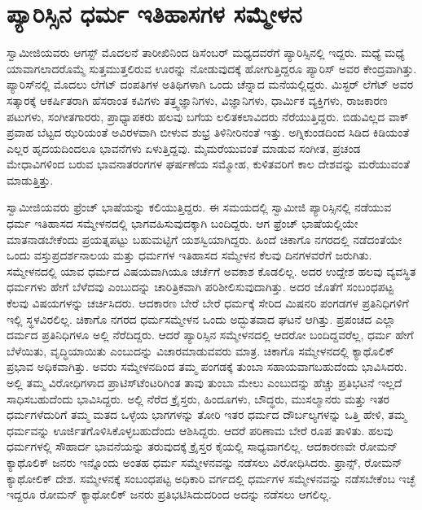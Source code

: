 
\chapter{ಪ್ಯಾರಿಸ್ಸಿನ ಧರ್ಮ ಇತಿಹಾಸಗಳ ಸಮ್ಮೇಳನ  }

 ಸ್ವಾಮೀಜಿಯವರು ಆಗಸ್ಟ್ ಮೊದಲನೆ ತಾರೀಖಿನಿಂದ ಡಿಸೆಂಬರ್ ಮಧ್ಯದವರೆಗೆ ಪ್ಯಾರಿಸ್ಸಿನಲ್ಲಿ ಇದ್ದರು. ಮಧ್ಯೆ ಮಧ್ಯೆ ಯಾವಾಗಲಾದರೊಮ್ಮೆ ಸುತ್ತಮುತ್ತಲಿರುವ ಊರನ್ನು ನೋಡುವುದಕ್ಕೆ ಹೋಗುತ್ತಿದ್ದರೂ ಪ್ಯಾರಿಸ್ ಅವರ ಕೇಂದ್ರವಾಗಿತ್ತು. ಪ್ಯಾರಿಸ್‍ನಲ್ಲಿ ಮೊದಲು ಲೆಗೆಟ್ ದಂಪತಿಗಳ ಅತಿಥಿಗಳಾಗಿ ಒಂದು ಚೆನ್ನಾದ ಮನೆಯಲ್ಲಿದ್ದರು. ಮಿಸ್ಟರ್ ಲೆಗೆಟ್ ಅವರ ಸತ್ಕಾರಕ್ಕೆ ಆಕರ್ಷಿತರಾಗಿ ಹೆಸರಾಂತ ಕವಿಗಳು ತತ್ತ್ವಜ್ಞಾನಿಗಳು, ವಿಜ್ಞಾನಿಗಳು, ಧಾರ್ಮಿಕ ವ್ಯಕ್ತಿಗಳು, ರಾಜಕಾರಣ ಪಟುಗಳು, ಸಂಗೀತಗಾರರು, ಪ್ರಾಧ್ಯಾಪಕರು ಹಲವು ಬಗೆಯ ಲಲಿತಕಲಾವಿದರು ನೆರೆಯುತ್ತಿದ್ದರು. ಬಿಡುವಿಲ್ಲದ ವಾಕ್ ಪ್ರವಾಹ ಬೆಟ್ಟದ ಝರಿಯಂತೆ ಅವಿರಳವಾಗಿ ಬೀಳುವ ಶುಭ್ರ ತಿಳಿನೀರಿನಂತೆ ಇತ್ತು. ಅಗ್ನಿಕುಂಡದಿಂದ ಸಿಡಿದ ಕಿಡಿಯಂತೆ ಎಲ್ಲರ ಹೃದಯದಿಂದಲೂ ಭಾವನೆಗಳು ಏಳುತ್ತಿದ್ದವು. ಮೈಮರೆಯುವಂತೆ ಮಾಡುವ ಸಂಗೀತ, ಪ್ರಚಂಡ ಮೇಧಾವಿಗಳಿಂದ ಬರುವ ಭಾವನಾತರಂಗಗಳ ಘರ್ಷಣೆಯ ಸಮ್ಮೋಹ, ಕುಳಿತವರಿಗೆ ಕಾಲ ದೇಶವನ್ನು ಮರೆಯುವಂತೆ ಮಾಡುತ್ತಿತ್ತು. 

 ಸ್ವಾಮೀಜಿಯವರು ಫ್ರೆಂಚ್ ಭಾಷೆಯನ್ನು ಕಲಿಯುತ್ತಿದ್ದರು. ಈ ಸಮಯದಲ್ಲಿ ಸ್ವಾಮೀಜಿ ಪ್ಯಾರಿಸ್ಸಿನಲ್ಲಿ ನಡೆಯುವ ಧರ್ಮ ಇತಿಹಾಸದ ಸಮ್ಮೇಳನದಲ್ಲಿ ಭಾಗವಹಿಸುವುದಕ್ಕಾಗಿ ಬಂದಿದ್ದರು. ಆಗ ಫ್ರೆಂಚ್ ಭಾಷೆಯಲ್ಲಿಯೇ ಮಾತನಾಡಬೇಕೆಂದು ಪ್ರಯತ್ನಪಟ್ಟು ಬಹುಮಟ್ಟಿಗೆ ಯಶಸ್ವಿಯಾಗಿದ್ದರು. ಹಿಂದೆ ಚಿಕಾಗೊ ನಗರದಲ್ಲಿ ನಡೆದಂತೆಯೇ ಒಂದು ವಸ್ತುಪ್ರದರ್ಶನಾಲಯ ಮತ್ತು ಧರ್ಮಗಳ ಇತಿಹಾಸದ ಸಮ್ಮೇಳನ ಕೆಲವು ದಿನಗಳವರೆಗೆ ಜರುಗಿತು. ಸಮ್ಮೇಳನದಲ್ಲಿ ಯಾವ ಧರ್ಮದ ವಿಷಯವಾಗಿಯೂ ಚರ್ಚೆಗೆ ಅವಕಾಶ ಕೊಡಲಿಲ್ಲ. ಅದರ ಉದ್ದೇಶ ಹಲವು ವ್ಯವಸ್ಥಿತ ಧರ್ಮಗಳು ಹೇಗೆ ಬೆಳೆದವು ಎಂಬುದನ್ನು ಚಾರಿತ್ರಿಕವಾಗಿ ಪರಿಶೀಲಿಸುವುದಾಗಿತ್ತು. ಅದರ ಜೊತೆಗೆ ಸಂಬಂಧಪಟ್ಟ ಕೆಲವು ವಿಷಯಗಳನ್ನು ಚರ್ಚಿಸಿದರು. ಆದಕಾರಣ ಬೇರೆ ಬೇರೆ ಧರ್ಮಕ್ಕೆ ಸೇರಿದ ಮಿಷನರಿ ಪಂಗಡಗಳ ಪ್ರತಿನಿಧಿಗಳಿಗೆ ಇಲ್ಲಿ ಸ್ಥಳವಿರಲಿಲ್ಲ. ಚಿಕಾಗೊ ನಗರದ ಧರ್ಮಸಮ್ಮೇಳನ ಒಂದು ಅದ್ಭುತವಾದ ಘಟನೆ ಆಗಿತ್ತು. ಪ್ರಪಂಚದ ಎಲ್ಲಾ ದರ್ಮದ ಪ್ರತಿನಿಧಿಗಳೂ ಅಲ್ಲಿ ನೆರೆದಿದ್ದರು. ಆದರೆ ಪ್ಯಾರಿಸ್ಸಿನ ಸಮ್ಮೇಳನದಲ್ಲಿ ಆದರೋ ಬಂದಿದ್ದವರೆಲ್ಲ, ಧರ್ಮ ಹೇಗೆ ಬೆಳೆಯಿತು, ವೃದ್ಧಿಯಾಯಿತು ಎಂಬುದನ್ನು ವಿಚಾರಮಾಡುವವರು ಮಾತ್ರ. ಚಿಕಾಗೊ ಸಮ್ಮೇಳನದಲ್ಲಿ ಕ್ಯಾಥೊಲಿಕ್ ಪ್ರಭಾವ ಅಧಿಕವಾಗಿತ್ತು. ಅವರು ಸಮ್ಮೇಳನದಿಂದ ತಮ್ಮ ಪಂಗಡಕ್ಕೆ ತುಂಬಾ ಸಹಾಯವಾಗಬಹುದೆಂದು ಭಾವಿಸಿದರು. ಅಲ್ಲಿ ತಮ್ಮ ವಿರೋಧಿಗಳಾದ ಪ್ರಾಟಿಸ್‍ಟೆಂಟರಿಗಿಂತ ತಾವು ತುಂಬಾ ಮೇಲು ಎಂಬುದನ್ನು ಹೆಚ್ಚು ಪ್ರತಿಭಟನೆ ಇಲ್ಲದೆ ಸಾಧಿಸಬಹುದೆಂದು ಭಾವಿಸಿದ್ದರು. ಅಲ್ಲಿ ನೆರೆದ ಕ್ರೈಸ್ತರು, ಹಿಂದೂಗಳು, ಬೌದ್ಧರು, ಮುಸಲ್ಮಾನರು ಮತ್ತು ಇತರ ಧರ್ಮಗಳೆದುರಿಗೆ ತಮ್ಮ ಮತದ ಒಳ್ಳೆಯ ಭಾಗಗಳನ್ನು ತೋರಿ ಇತರ ಧರ್ಮದ ದೌರ್ಬಲ್ಯಗಳನ್ನು ಒತ್ತಿ ಹೇಳಿ, ತಮ್ಮ ಧರ್ಮವನ್ನು ಊರ್ಜಿತಗೊಳಿಸಿಕೊಳ್ಳಬಹುದೆಂದು ಆಶಿಸಿದ್ದರು. ಆದರೆ ಪರಿಣಾಮ ಬೇರೆ ರೂಪ ತಾಳಿತು. ಹಲವು ಧರ್ಮಗಳಲ್ಲಿ ಸೌಹಾರ್ದ ಭಾವನೆಯನ್ನು ತರುವುದಕ್ಕೆ ಕ್ರೈಸ್ತರ ಕೈಯಲ್ಲಿ ಸಾಧ್ಯವಾಗಲಿಲ್ಲ. ಆದಕಾರಣವೇ ರೋಮನ್ ಕ್ಯಾಥೊಲಿಕ್ ಜನರು ಇನ್ನೊಂದು ಅಂತಹ ಧರ್ಮ ಸಮ್ಮೇಳನವನ್ನು ನಡೆಸಲು ವಿರೋಧಿಸಿದರು. ಫ್ರಾನ್ಸ್, ರೋಮನ್ ಕ್ಯಾಥೋಲಿಕ್ ದೇಶ. ಸಮ್ಮೇಳನಕ್ಕೆ ಸಂಬಂಧಪಟ್ಟ ಅಧಿಕಾರಿ ವರ್ಗದಲ್ಲಿ ಧರ್ಮಗಳ ಸಮ್ಮೇಳನವನ್ನು ನಡೆಸಬೇಕೆಂಬ ಇಚ್ಛೆ ಇದ್ದರೂ ರೋಮನ್ ಕ್ಯಾಥೋಲಿಕ್ ಜನರು ಪ್ರತಿಭಟಿಸಿದುದರಿಂದ ಅದನ್ನು ನಡೆಸಲು ಆಗಲಿಲ್ಲ. 


